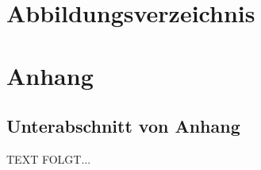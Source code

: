 \documentclass[a4paper,12pt,oneside]{article}
\begin{document}
   
   \newpage
    \section*{Abbildungsverzeichnis}
  \renewcommand{\listfigurename}{} %
  \listoffigures
  
  \newpage
  \listoftables

  \newpage
  \pagestyle{fancy}
  \setcounter{section}{0} %
  \renewcommand*\thesection{\Alph{section}} %
  \section{Anhang}\label{anhang}
    \subsection{Unterabschnitt von Anhang}\label{subsec_UabsAnhang}
    TEXT FOLGT...
  
  \newpage
  \pagestyle{empty}
  
 
  
%
    
\end{document}
